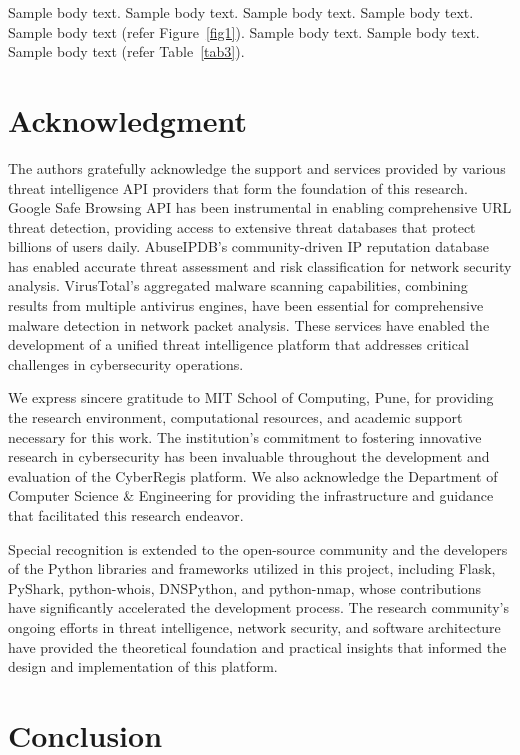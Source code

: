 \documentclass[pdflatex,sn-mathphys-num]{sn-jnl}%
\theoremstyle{thmstyleone}%
\theoremstyle{thmstyletwo}%
\theoremstyle{thmstylethree}%
\begin{document}
Sample body text. Sample body text. Sample body text. Sample body text. Sample body text (refer Figure~\ref{fig1}). Sample body text. Sample body text. Sample body text (refer Table~\ref{tab3}). 

\section{Acknowledgment}\label{sec11}

The authors gratefully acknowledge the support and services provided by various threat intelligence API providers that form the foundation of this research. Google Safe Browsing API has been instrumental in enabling comprehensive URL threat detection, providing access to extensive threat databases that protect billions of users daily. AbuseIPDB's community-driven IP reputation database has enabled accurate threat assessment and risk classification for network security analysis. VirusTotal's aggregated malware scanning capabilities, combining results from multiple antivirus engines, have been essential for comprehensive malware detection in network packet analysis. These services have enabled the development of a unified threat intelligence platform that addresses critical challenges in cybersecurity operations.

We express sincere gratitude to MIT School of Computing, Pune, for providing the research environment, computational resources, and academic support necessary for this work. The institution's commitment to fostering innovative research in cybersecurity has been invaluable throughout the development and evaluation of the CyberRegis platform. We also acknowledge the Department of Computer Science \& Engineering for providing the infrastructure and guidance that facilitated this research endeavor.

Special recognition is extended to the open-source community and the developers of the Python libraries and frameworks utilized in this project, including Flask, PyShark, python-whois, DNSPython, and python-nmap, whose contributions have significantly accelerated the development process. The research community's ongoing efforts in threat intelligence, network security, and software architecture have provided the theoretical foundation and practical insights that informed the design and implementation of this platform.

\section{Conclusion}\label{sec12}
\end{document}
